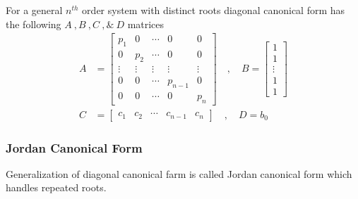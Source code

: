 \documentclass[twoside]{article}
\begin{document}
For a general $n^{th}$ order system with distinct
roots diagonal canonical form has the following 
$A \ ,  B \ ,  C \ , \& \ D$ matrices
%
\begin{align*}
A &= \left[ \begin{array}{ccccc} p_1 & 0 & \cdots & 0 & 0
              \\ 0 & p_2 & \cdots & 0 & 0
\\ \vdots & \vdots & \vdots & \vdots & \vdots
\\ 0 & 0 & \cdots & p_{n-1} & 0
    \\ 0 & 0 & \cdots & 0 & p_n \end{array} \right]
\quad , \quad 
B = \left[ \begin{array}{c} 1 \\ 1 \\ \vdots \\ 1 \\  1
\end{array} \right]
\\ C &= \left[ \begin{array}{ccccc} c_1 & c_2 & \cdots &  c_{n-1} & c_n \end{array} \right]
\quad , \quad
D = b_0
\end{align*}
%

\subsubsection*{Jordan Canonical Form}

Generalization of diagonal canonical
farm is called Jordan canonical form
which handles repeated roots.
\end{document}
